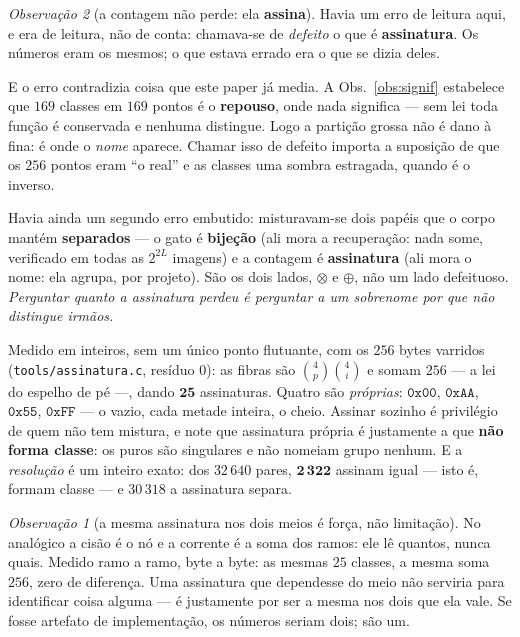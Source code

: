 \documentclass[11pt]{article}
\newcommand{\code}[1]{\texttt{\small #1}}
\theoremstyle{plain}
\theoremstyle{remark}
\newtheorem{obs}{Observação}
\begin{document}
\begin{obs}[a contagem não perde: ela \textbf{assina}]\label{obs:assinatura}
Havia um erro de leitura aqui, e era de leitura, não de conta: chamava-se de \emph{defeito} o que é
\textbf{assinatura}. Os números eram os mesmos; o que estava errado era o que se dizia deles.

E o erro contradizia coisa que este paper já media. A Obs.~\ref{obs:signif} estabelece que $169$
classes em $169$ pontos é o \textbf{repouso}, onde nada significa --- sem lei toda função é
conservada e nenhuma distingue. Logo a partição grossa não é dano à fina: é onde o \emph{nome}
aparece. Chamar isso de defeito importa a suposição de que os $256$ pontos eram ``o real'' e as
classes uma sombra estragada, quando é o inverso.

Havia ainda um segundo erro embutido: misturavam-se dois papéis que o corpo mantém \textbf{separados}
--- o gato é \textbf{bijeção} (ali mora a recuperação: nada some, verificado em todas as $2^{2L}$
imagens) e a contagem é \textbf{assinatura} (ali mora o nome: ela agrupa, por projeto). São os dois
lados, $\otimes$ e $\oplus$, não um lado defeituoso. \emph{Perguntar quanto a assinatura perdeu é
perguntar a um sobrenome por que não distingue irmãos.}

Medido em inteiros, sem um único ponto flutuante, com os $256$ bytes varridos
(\code{tools/assinatura.c}, resíduo $0$): as fibras são $\binom4p\binom4i$ e somam $256$ --- a lei do
espelho de pé ---, dando $\mathbf{25}$ assinaturas. Quatro são \emph{próprias}: $\mathtt{0x00}$,
$\mathtt{0xAA}$, $\mathtt{0x55}$, $\mathtt{0xFF}$ --- o vazio, cada metade inteira, o cheio. Assinar
sozinho é privilégio de quem não tem mistura, e note que assinatura própria é justamente a que
\textbf{não forma classe}: os puros são singulares e não nomeiam grupo nenhum. E a \emph{resolução} é
um inteiro exato: dos $32\,640$ pares, $\mathbf{2\,322}$ assinam igual --- isto é, formam classe --- e
$30\,318$ a assinatura separa.

\begin{obs}[a mesma assinatura nos dois meios é força, não limitação]
No analógico a cisão é o nó e a corrente é a soma dos ramos: ele lê quantos, nunca quais. Medido ramo
a ramo, byte a byte: as mesmas $25$ classes, a mesma soma $256$, zero de diferença. Uma assinatura que
dependesse do meio não serviria para identificar coisa alguma --- é justamente por ser a mesma nos dois
que ela vale. Se fosse artefato de implementação, os números seriam dois; são um.
\end{obs}
\end{obs}
\end{document}
